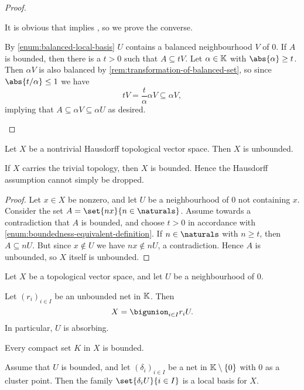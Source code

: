 \documentclass[article, a4paper, 11pt, oneside]{memoir}
\numberwithin{equation}{chapter}
\begin{document}
\begin{proof}
\begin{proofsec}
    It is obvious that  implies , so we prove the converse.

    By \cref{enum:balanced-local-basis} $U$ contains a balanced neighbourhood $V$ of $0$. If $A$ is bounded, then there is a $t > 0$ such that $A \subseteq tV$. Let $\alpha \in \mathbb{K}$ with $\abs{\alpha} \geq t$. Then $\alpha V$ is also balanced by \cref{rem:transformation-of-balanced-set}, so since $\abs{t/\alpha} \leq 1$ we have
    \begin{equation*}
        tV
            = \frac{t}{\alpha} \alpha V
            \subseteq \alpha V,
    \end{equation*}
    implying that $A \subseteq \alpha V \subseteq \alpha U$ as desired.
\end{proofsec}
\end{proof}


\begin{corollary}
    \label{enum:Hausdorff-space-unbounded}
    Let $X$ be a nontrivial Hausdorff topological vector space. Then $X$ is unbounded.
\end{corollary}
%
If $X$ carries the trivial topology, then $X$ is bounded. Hence the Hausdorff assumption cannot simply be dropped.

\begin{proof}
    Let $x \in X$ be nonzero, and let $U$ be a neighbourhood of $0$ not containing $x$. Consider the set $A = \set{nx}{n \in \naturals}$. Assume towards a contradiction that $A$ is bounded, and choose $t > 0$ in accordance with \cref{enum:boundedness-equivalent-definition}. If $n \in \naturals$ with $n \geq t$, then $A \subseteq nU$. But since $x \not\in U$ we have $nx \not\in nU$, a contradiction. Hence $A$ is unbounded, so $X$ itself is unbounded.
\end{proof}


\begin{proposition}
    Let $X$ be a topological vector space, and let $U$ be a neighbourhood of $0$.
    \begin{enumprop}
        \item \label{enum:0-neighbourhood-absorbing} Let $(r_i)_{i \in I}$ be an unbounded net in $\mathbb{K}$. Then
        \begin{equation*}
            X = \bigunion_{i \in I} r_i U.
        \end{equation*}
        In particular, $U$ is absorbing.

        \item \label{enum:compact-implies-bounded} Every compact set $K$ in $X$ is bounded.

        \item \label{enum:bounded-nhood-local-basis} Assume that $U$ is bounded, and let $(\delta_i)_{i \in I}$ be a net in $\mathbb{K} \setminus \{0\}$ with $0$ as a cluster point. Then the family $\set{\delta_i U}{i \in I}$ is a local basis for $X$.
    \end{enumprop}
\end{proposition}
\end{document}
